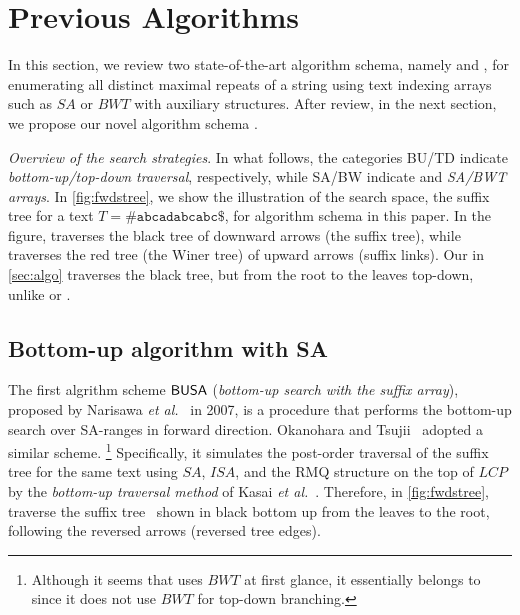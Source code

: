 \section{Previous Algorithms}
\label{sec:prev}

In this section, we review two state-of-the-art algorithm schema, namely \BUSA{} and \TDBW{}, for enumerating all distinct maximal repeats of a string using text indexing arrays such as $SA$ or $BWT$ with auxiliary structures.
After review, in the next section, we propose our novel algorithm schema \TDSA{}.


\textit{Overview of the search strategies}. In what follows, the categories \textsf{BU}/\textsf{TD} indicate \textit{bottom-up/top-down traversal}, respectively, while \textsf{SA}/\textsf{BW} indicate and \textit{SA/BWT arrays}. 
In \cref{fig:fwdstree}, we show the illustration of the search space, the suffix tree for a text $T = \mathtt{\#abcadabcabc\$}$, for algorithm schema in this paper. In the figure, \BUSA{} traverses the black tree of downward arrows (the suffix tree), while  \TDBW{} traverses the red tree (the Winer tree) of upward arrows (suffix links). Our \TDSA{} in \cref{sec:algo} traverses the black tree, but from the root to the leaves top-down, unlike \BUSA{} or \TDBW{}. 


\subsection{Bottom-up algorithm with SA}
\label{sec:prev:busa}
The first algrithm scheme $\textsf{BUSA}$ (\textit{bottom-up search with the suffix array}), proposed by Narisawa \textit{et al.}~\cite{narisawa2007efficient,narisawa2017efficient} in 2007, is a procedure that performs the bottom-up search over SA-ranges in forward direction.
Okanohara and Tsujii~\cite{okanohara2009text} adopted a similar scheme.
\footnote{Although it seems that \cite{okanohara2009text} uses $BWT$ at first glance, it essentially belongs to \BUSA{} since it does not use $BWT$ for top-down branching.}
Specifically, it simulates the post-order traversal of the suffix tree for the same text using $SA$, $ISA$, and the RMQ structure on the top of $LCP$ by the \textit{bottom-up traversal method} of
Kasai \textit{et al.}~\cite{kasai:lee2001lcp:linear}.
Therefore, in \cref{fig:fwdstree}, \BUSA{} traverse the suffix tree~\cite{gusfield1997algorithms} shown in black bottom up from the leaves to the root, following the reversed arrows (reversed tree edges). 

